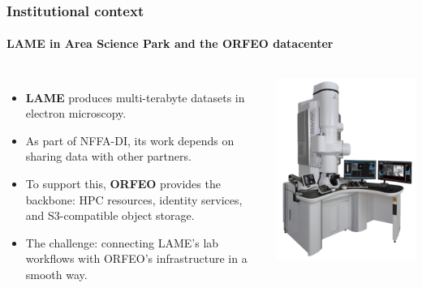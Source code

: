 \documentclass{beamer}
\begin{document}
	\begin{frame}
		\frametitle{Institutional context}
		\framesubtitle{LAME in Area Science Park and the ORFEO datacenter}
		\begin{columns}[T,totalwidth=\textwidth]
			\begin{itemize}
				\item \textbf{LAME} produces multi-terabyte datasets in electron microscopy.
				\item As part of NFFA-DI, its work depends on sharing data with other partners.
				\item To support this, \textbf{ORFEO} provides the backbone: HPC resources, identity services, and S3-compatible object storage.
				\item The challenge: connecting LAME’s lab workflows with ORFEO’s infrastructure in a smooth way.
			\end{itemize}
			\includegraphics[width=\textwidth]{otherResources/LAME_microscope.png}
		\end{columns}
	\end{frame}
	
\end{document}
